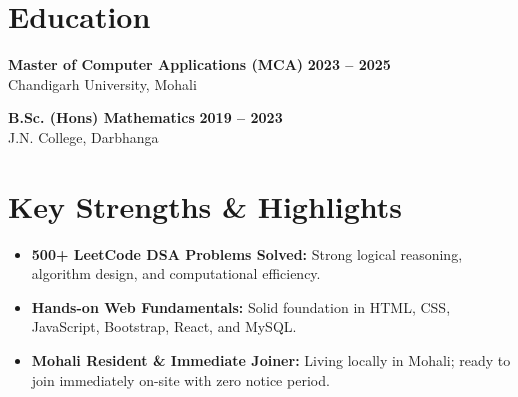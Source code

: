 \documentclass[a4paper,10pt]{article}
\begin{document}
\section*{Education}

\textbf{Master of Computer Applications (MCA)}
\hfill
\textbf{2023 -- 2025}
\\
Chandigarh University, Mohali

\vspace{3pt}

\textbf{B.Sc. (Hons) Mathematics}
\hfill
\textbf{2019 -- 2023}
\\
J.N. College, Darbhanga

\section*{Key Strengths \& Highlights}

\begin{itemize}

    \item \textbf{500+ LeetCode DSA Problems Solved:} Strong logical reasoning, algorithm design, and computational efficiency.

    \item \textbf{Hands-on Web Fundamentals:} Solid foundation in HTML, CSS, JavaScript, Bootstrap, React, and MySQL.

    \item \textbf{Mohali Resident & Immediate Joiner:} Living locally in Mohali; ready to join immediately on-site with zero notice period.

\end{itemize}

\end{document}
